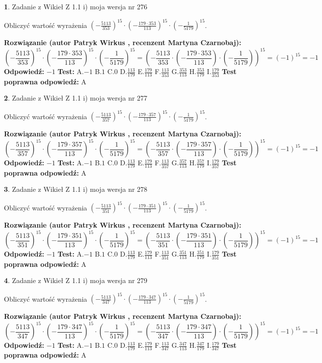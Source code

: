 \documentclass[12pt, a4paper]{article}
\theoremstyle{definition} %
\newtheorem{zad}{}
\newcommand{\zadStart}[1]{\begin{zad}#1\newline}
\newcommand{\zadStop}{\end{zad}}
\newcommand{\rozwStart}[2]{\noindent \textbf{Rozwiązanie (autor #1 , recenzent #2): }\newline}
\newcommand{\rozwStop}{\newline}
\newcommand{\odpStart}{\noindent \textbf{Odpowiedź:}\newline}
\newcommand{\odpStop}{\newline}
\newcommand{\testStart}{\noindent \textbf{Test:}\newline}
\newcommand{\testStop}{\newline}
\newcommand{\kluczStart}{\noindent \textbf{Test poprawna odpowiedź:}\newline}
\newcommand{\kluczStop}{\newline}
\begin{document}
\zadStart{Zadanie z Wikieł Z 1.1 i) moja wersja nr 276}

Obliczyć wartość wyrażenia $(-\frac{5113}{353})^{15} \cdot (-\frac{179 \cdot 353}{113})^{15} \cdot (-\frac{1}{5179})^{15}$.
\zadStop
\rozwStart{Patryk Wirkus}{Martyna Czarnobaj}
$$(-\frac{5113}{353})^{15} \cdot (-\frac{179 \cdot 353}{113})^{15} \cdot (-\frac{1}{5179})^{15} = (-\frac{5113}{353} \cdot (-\frac{179 \cdot 353}{113}) \cdot (-\frac{1}{5179}))^{15} = (-1)^{15} = -1$$
\rozwStop
\odpStart
$-1$
\odpStop
\testStart
A.$-1$ B.$1$ C.$0$ D.$\frac{113}{179}$ E.$\frac{179}{113}$
F.$\frac{113}{353}$ G.$\frac{353}{113}$
H.$\frac{353}{179}$
I.$\frac{179}{353}$
\testStop
\kluczStart
A
\kluczStop



\zadStart{Zadanie z Wikieł Z 1.1 i) moja wersja nr 277}

Obliczyć wartość wyrażenia $(-\frac{5113}{357})^{15} \cdot (-\frac{179 \cdot 357}{113})^{15} \cdot (-\frac{1}{5179})^{15}$.
\zadStop
\rozwStart{Patryk Wirkus}{Martyna Czarnobaj}
$$(-\frac{5113}{357})^{15} \cdot (-\frac{179 \cdot 357}{113})^{15} \cdot (-\frac{1}{5179})^{15} = (-\frac{5113}{357} \cdot (-\frac{179 \cdot 357}{113}) \cdot (-\frac{1}{5179}))^{15} = (-1)^{15} = -1$$
\rozwStop
\odpStart
$-1$
\odpStop
\testStart
A.$-1$ B.$1$ C.$0$ D.$\frac{113}{179}$ E.$\frac{179}{113}$
F.$\frac{113}{357}$ G.$\frac{357}{113}$
H.$\frac{357}{179}$
I.$\frac{179}{357}$
\testStop
\kluczStart
A
\kluczStop



\zadStart{Zadanie z Wikieł Z 1.1 i) moja wersja nr 278}

Obliczyć wartość wyrażenia $(-\frac{5113}{351})^{15} \cdot (-\frac{179 \cdot 351}{113})^{15} \cdot (-\frac{1}{5179})^{15}$.
\zadStop
\rozwStart{Patryk Wirkus}{Martyna Czarnobaj}
$$(-\frac{5113}{351})^{15} \cdot (-\frac{179 \cdot 351}{113})^{15} \cdot (-\frac{1}{5179})^{15} = (-\frac{5113}{351} \cdot (-\frac{179 \cdot 351}{113}) \cdot (-\frac{1}{5179}))^{15} = (-1)^{15} = -1$$
\rozwStop
\odpStart
$-1$
\odpStop
\testStart
A.$-1$ B.$1$ C.$0$ D.$\frac{113}{179}$ E.$\frac{179}{113}$
F.$\frac{113}{351}$ G.$\frac{351}{113}$
H.$\frac{351}{179}$
I.$\frac{179}{351}$
\testStop
\kluczStart
A
\kluczStop



\zadStart{Zadanie z Wikieł Z 1.1 i) moja wersja nr 279}

Obliczyć wartość wyrażenia $(-\frac{5113}{347})^{15} \cdot (-\frac{179 \cdot 347}{113})^{15} \cdot (-\frac{1}{5179})^{15}$.
\zadStop
\rozwStart{Patryk Wirkus}{Martyna Czarnobaj}
$$(-\frac{5113}{347})^{15} \cdot (-\frac{179 \cdot 347}{113})^{15} \cdot (-\frac{1}{5179})^{15} = (-\frac{5113}{347} \cdot (-\frac{179 \cdot 347}{113}) \cdot (-\frac{1}{5179}))^{15} = (-1)^{15} = -1$$
\rozwStop
\odpStart
$-1$
\odpStop
\testStart
A.$-1$ B.$1$ C.$0$ D.$\frac{113}{179}$ E.$\frac{179}{113}$
F.$\frac{113}{347}$ G.$\frac{347}{113}$
H.$\frac{347}{179}$
I.$\frac{179}{347}$
\testStop
\kluczStart
A
\kluczStop
\end{document}
